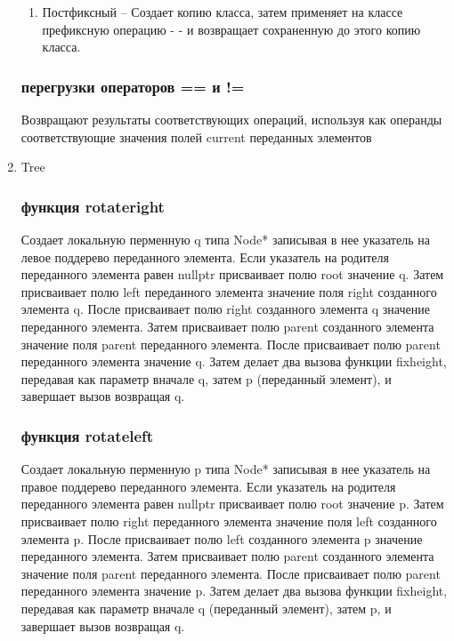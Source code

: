 \documentclass[a4paper,12pt]{article}
\begin{document}
\begin{enumerate}
\begin{enumerate}
      \item Постфиксный --
      Создает копию класса, затем применяет на классе префиксную операцию - - и возвращает сохраненную до этого копию класса.
    
      \end{enumerate}
      
      \subsubsection{перегрузки операторов == и !=}
      Возвращают результаты соответствующих операций, используя как операнды соответствующие значения полей current переданных элементов
      
    \item Tree
      \subsubsection{функция rotateright}
      Создает локальную перменную q типа Node* записывая в нее указатель на левое поддерево переданного элемента. Если указатель на родителя переданного элемента равен nullptr присваивает полю root значение q. Затем присваивает полю left переданного элемента значение поля right созданного элемента q. После присваивает полю right созданного элемента q значение переданного элемента. Затем присваивает полю parent созданного элемента значение поля parent переданного элемента. После присваивает полю parent переданного элемента значение q. Затем делает два вызова функции fixheight, передавая как параметр вначале q, затем p (переданный элемент), и завершает вызов возвращая q.
      
      \subsubsection{функция rotateleft}
      Создает локальную перменную p типа Node* записывая в нее указатель на правое поддерево переданного элемента. Если указатель на родителя переданного элемента равен nullptr присваивает полю root значение p. Затем присваивает полю right переданного элемента значение поля left созданного элемента p. После присваивает полю left созданного элемента p значение переданного элемента. Затем присваивает полю parent созданного элемента значение поля parent переданного элемента. После присваивает полю parent переданного элемента значение p. Затем делает два вызова функции fixheight, передавая как параметр вначале q (переданный элемент), затем p, и завершает вызов возвращая q.
      

\end{enumerate}
\end{document}
